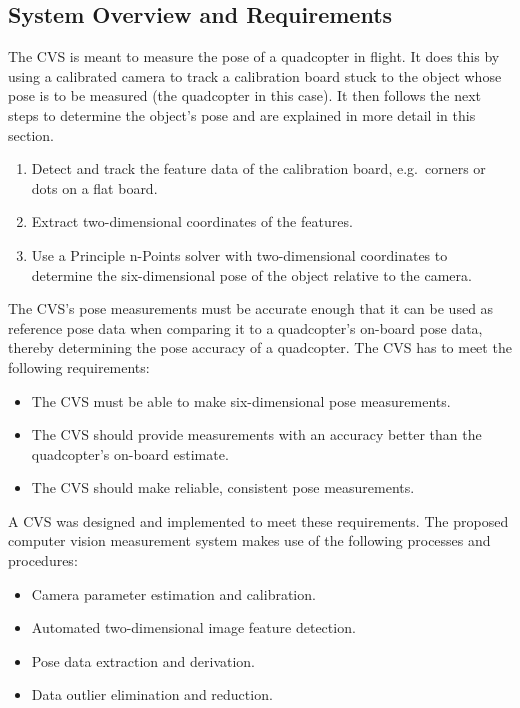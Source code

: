 \subsection{System Overview and Requirements}

The CVS is meant to measure the pose of a quadcopter in flight. It does this by using a calibrated camera to track a calibration board stuck to the object whose pose is to be measured (the quadcopter in this case). It then follows the next steps to determine the object's pose and are explained in more detail in this section. 

\begin{enumerate}
  \item Detect and track the feature data of the calibration board, e.g.\ corners or dots on a flat board. 
  \item Extract two-dimensional coordinates of the features.
  \item Use a Principle n-Points solver with two-dimensional coordinates to determine the six-dimensional pose of the object relative to the camera. 
\end{enumerate}

The CVS's pose measurements must be accurate enough that it can be used as reference pose data when comparing it to a quadcopter's on-board pose data, thereby determining the pose accuracy of a quadcopter. The CVS has to meet the following requirements:

\begin{itemize}
  \item The CVS must be able to make six-dimensional pose measurements.
  \item The CVS should provide measurements with an accuracy better than the quadcopter's on-board estimate.
  \item The CVS should make reliable, consistent pose measurements.
\end{itemize}

A CVS was designed and implemented to meet these requirements. The proposed computer vision measurement system makes use of the following processes and procedures: 

\begin{itemize}
  \item Camera parameter estimation and calibration.
  \item Automated two-dimensional image feature detection.
  \item Pose data extraction and derivation.
  \item Data outlier elimination and reduction. 
\end{itemize}

